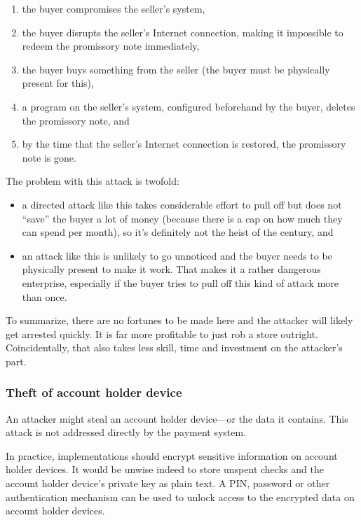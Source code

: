 \documentclass[12pt,a4paper]{article}
\begin{document}
\begin{multicols}{2}
	\begin{enumerate}
		\item the buyer compromises the seller's system,
		\item the buyer disrupts the seller's Internet connection, making it impossible to redeem the promissory note immediately,
		\item the buyer buys something from the seller (the buyer must be physically present for this),
		\item a program on the seller's system, configured beforehand by the buyer, deletes the promissory note, and
		\item by the time that the seller's Internet connection is restored, the promissory note is gone.
	\end{enumerate}

	The problem with this attack is twofold:

	\begin{itemize}
		\item a directed attack like this takes considerable effort to pull off but does not ``save'' the buyer a lot of money (because there is a cap on how much they can spend per month), so it's definitely not the heist of the century, and
		\item an attack like this is unlikely to go unnoticed and the buyer needs to be physically present to make it work. That makes it a rather dangerous enterprise, especially if the buyer tries to pull off this kind of attack more than once.
	\end{itemize}

	To summarize, there are no fortunes to be made here and the attacker will likely get arrested quickly. It is far more profitable to just rob a store outright. Coincidentally, that also takes less skill, time and investment on the attacker's part.

	\subsubsection{Theft of account holder device}

	An attacker might steal an account holder device---or the data it contains. This attack is not addressed directly by the payment system.

	In practice, implementations should encrypt sensitive information on account holder devices. It would be unwise indeed to store unspent checks and the account holder device's private key as plain text. A PIN, password or other authentication mechanism can be used to unlock access to the encrypted data on account holder devices.


\end{multicols}
\end{document}
